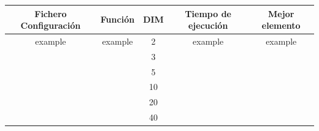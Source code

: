 \begin{tabular}{|c|c|c|c|c|}
    \hline
    \textbf{Fichero Configuración} & \textbf{Función} & \textbf{DIM} & \textbf{Tiempo de ejecución} & \textbf{Mejor elemento} \\ \hline
    example                                     & example          & 2      & example                      & example                 \\ \hline
                                                &                  & 3             &                              &                         \\ \hline
                                                &                  & 5             &                              &                         \\ \hline
                                                &                  & 10             &                              &                         \\ \hline
                                                &                  & 20             &                              &                         \\ \hline
                                                &                  & 40             &                              &                         \\ \hline

\end{tabular}

